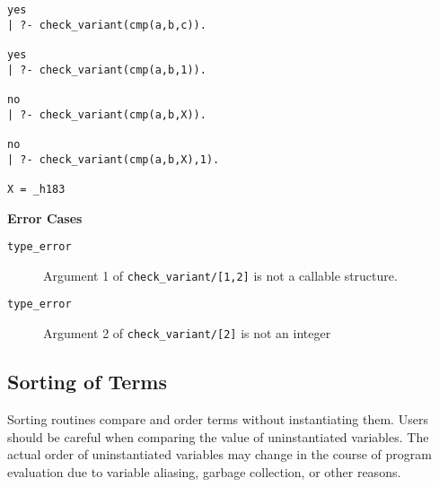 \begin{description}
\begin{example}
\begin{small}
\begin{verbatim}
yes
| ?- check_variant(cmp(a,b,c)).

yes
| ?- check_variant(cmp(a,b,1)).

no
| ?- check_variant(cmp(a,b,X)).

no
| ?- check_variant(cmp(a,b,X),1).

X = _h183
\end{verbatim}
\end{small}
\end{example}

{\bf Error Cases}
     \begin{description}
     \item[{\tt type\_error}]
	Argument 1 of {\tt check\_variant/[1,2]} is not a callable structure.
     \item[{\tt type\_error}]
	Argument 2 of {\tt check\_variant/[2]} is not an integer
     \end{description}

\end{description}

\subsection{Sorting of Terms}

Sorting routines compare and order terms without instantiating them.
Users should be careful when comparing the value of uninstantiated
variables.  The actual order of uninstantiated variables may change in
the course of program evaluation due to variable aliasing, garbage
collection, or other reasons.

